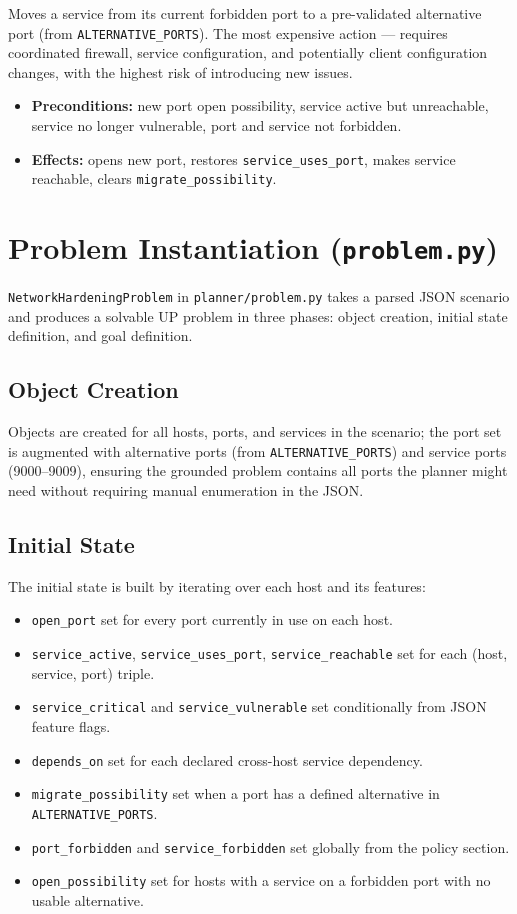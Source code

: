 \documentclass[12pt,a4paper]{article}
\begin{document}
	Moves a service from its current forbidden port to a pre-validated alternative port (from
	\texttt{ALTERNATIVE\_PORTS}). The most expensive action --- requires coordinated firewall, service
	configuration, and potentially client configuration changes, with the highest risk of introducing
	new issues.
	\begin{itemize}[leftmargin=1.5em]
		\item \textbf{Preconditions:} new port open possibility, service active but unreachable, service no longer vulnerable, port and service not forbidden.
		\item \textbf{Effects:} opens new port, restores \texttt{service\_uses\_port}, makes service reachable, clears \texttt{migrate\_possibility}.
	\end{itemize}
	\newpage
	\section{Problem Instantiation (\texttt{problem.py})}
	
	\texttt{NetworkHardeningProblem} in \texttt{planner/problem.py} takes a parsed JSON scenario and
	produces a solvable UP problem in three phases: object creation, initial state definition, and
	goal definition.
	
	\subsection{Object Creation}
	
	Objects are created for all hosts, ports, and services in the scenario; the port set is augmented
	with alternative ports (from \texttt{ALTERNATIVE\_PORTS}) and service ports (9000--9009), ensuring
	the grounded problem contains all ports the planner might need without requiring manual enumeration
	in the JSON.
	
	\subsection{Initial State}
	
	The initial state is built by iterating over each host and its features:
	\begin{itemize}[leftmargin=1.5em]
		\item \texttt{open\_port} set for every port currently in use on each host.
		\item \texttt{service\_active}, \texttt{service\_uses\_port}, \texttt{service\_reachable} set for each (host, service, port) triple.
		\item \texttt{service\_critical} and \texttt{service\_vulnerable} set conditionally from JSON feature flags.
		\item \texttt{depends\_on} set for each declared cross-host service dependency.
		\item \texttt{migrate\_possibility} set when a port has a defined alternative in \texttt{ALTERNATIVE\_PORTS}.
		\item \texttt{port\_forbidden} and \texttt{service\_forbidden} set globally from the policy section.
		\item \texttt{open\_possibility} set for hosts with a service on a forbidden port with no usable alternative.
	\end{itemize}
	\newpage
\end{document}
